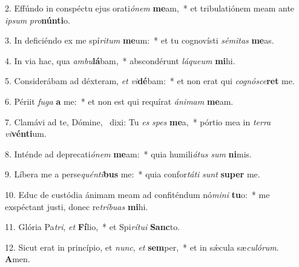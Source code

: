2. Effúndo in conspéctu ejus orati\textit{ó}\textit{nem} \textbf{me}am,~*  et tribulatiónem meam ante \textit{ip}\textit{sum} \textit{pro}\textbf{nún}\textbf{ti}o.\

3. In deficiéndo ex me spí\textit{ri}\textit{tum} \textbf{me}um:~*  et tu cognovísti \textit{sé}\textit{mi}\textit{tas} \textbf{me}as.\

4. In via hac, qua \textit{am}\textit{bu}\textbf{lá}bam,~*  abscondérunt \textit{lá}\textit{que}\textit{um} \textbf{mi}hi.\

5. Considerábam ad déxteram, \textit{et} \textit{vi}\textbf{dé}bam:~*  et non erat qui \textit{co}\textit{gnó}\textit{sce}\textbf{ret} me.\

6. Périit \textit{fu}\textit{ga} \textbf{a} me:~*  et non est qui requírat \textit{á}\textit{ni}\textit{mam} \textbf{me}am.\

7. Clamávi ad te, Dómine, \dag\  dixi: Tu \textit{es} \textit{spes} \textbf{me}a,~*  pórtio mea in \textit{ter}\textit{ra} \textit{vi}\textbf{vén}\textbf{ti}um.\

8. Inténde ad deprecati\textit{ó}\textit{nem} \textbf{me}am:~*  quia humili\textit{á}\textit{tus} \textit{sum} \textbf{ni}mis.\

9. Líbera me a perse\textit{quén}\textit{ti}\textbf{bus} me:~*  quia confor\textit{tá}\textit{ti} \textit{sunt} \textbf{su}\textbf{per} me.\

10. Educ de custódia ánimam meam ad confiténdum nó\textit{mi}\textit{ni} \textbf{tu}o:~*  me exspéctant justi, donec re\textit{trí}\textit{bu}\textit{as} \textbf{mi}hi.\

11. Glória Pa\textit{tri}, \textit{et} \textbf{Fí}lio,~*  et Spi\textit{rí}\textit{tu}\textit{i} \textbf{Sanc}to.\

12. Sicut erat in princípio, et \textit{nunc}, \textit{et} \textbf{sem}per,~*  et in sǽcula sæ\textit{cu}\textit{ló}\textit{rum}. \textbf{A}men.\


